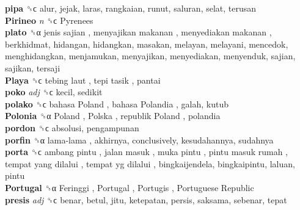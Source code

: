\textbf{pipa} ␝ϲ  alur, jejak, laras, rangkaian, runut, saluran, selat, terusan  \\
\textbf{Pirineo} \emph{n}  ␝ϲ   Pyrenees   \\
\textbf{plato} ␝α   jenis sajian ,  menyajikan makanan ,  menyediakan makanan , berkhidmat, hidangan, hidangkan, masakan, melayan, melayani, mencedok, menghidangkan, menjamukan, menyajikan, menyediakan, menyenduk, sajian, sajikan, tersaji  \\
\textbf{Playa} ␝ϲ   tebing laut ,  tepi tasik , pantai  \\
\textbf{poko} \emph{adj}  ␝ϲ  kecil, sedikit  \\
\textbf{polako} ␝ϲ   bahasa Poland ,  bahasa Polandia , galah, kutub  \\
\textbf{Polonia} ␝α   Poland ,  Polska ,  republik Poland , polandia  \\
\textbf{pordon} ␝ϲ  absolusi, pengampunan  \\
\textbf{porfin} ␝α   lama-lama , akhirnya, conclusively, kesudahannya, sudahnya  \\
\textbf{porta} ␝ϲ   ambang pintu ,  jalan masuk ,  muka pintu ,  pintu masuk rumah ,  tempat yang dilalui ,  tempat yg dilalui , bingkaijendela, bingkaipintu, laluan, pintu  \\
\textbf{Portugal} ␝α   Feringgi ,  Portugal ,  Portugis ,  Portuguese Republic   \\
\textbf{presis} \emph{adj}  ␝ϲ  benar, betul, jitu, ketepatan, persis, saksama, sebenar, tepat  \\
